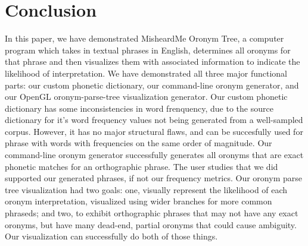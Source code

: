 \chapter{Conclusion}
\label{conclusion}

In this paper, we have demonstrated  MisheardMe Oronym Tree, a computer program which takes in textual phrases in English, determines all oronyms for that phrase and then visualizes them with associated information to indicate the likelihood of interpretation.
We have demonstrated all three major functional parts: our custom phonetic dictionary, our command-line oronym generator, and our OpenGL oronym-parse-tree visualization generator.  Our custom phonetic dictionary has some inconsistencies in word frenquency, due to the source dictionary for it's word frequency values not being generated from a well-sampled corpus. However, it has no major structural flaws, and can be succesfully used for phrase with words with frequencies on the same order of magnitude.   Our command-line oronym generator successfully generates all oronyms that are exact phonetic matches for an orthographic phrase.  The user studies that we did supported our generated phrases, if not our frequency metrics.  Our oronym parse tree visualization had two goals: one, visually represent the likelihood of each oronym interpretation, visualized using wider branches for more common phraseds; and two, to exhibit orthographic phrases that may not have any exact oronyms, but have many dead-end, partial oronyms that could cause ambiguity. Our visualization can successfully do both of those things.
